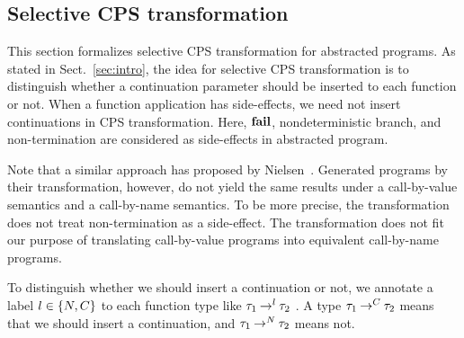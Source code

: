 \subsection{Selective CPS transformation}
\label{sec:CPS}

This section formalizes selective CPS transformation for abstracted
programs.  As stated in Sect.~\ref{sec:intro}, the idea for selective CPS
transformation is to distinguish whether a continuation parameter should
be inserted to each function or not.  When a function application has
side-effects, we need not insert continuations in CPS transformation.
Here, $\FAIL$, nondeterministic branch, and non-termination are
considered as side-effects in abstracted program.

Note that a similar approach has proposed by Nielsen~\cite{Nielsen2001}.
Generated programs by their transformation, however, do not yield the
same results under a call-by-value semantics and a call-by-name
semantics.  To be more precise, the transformation does not treat
non-termination as a side-effect.  The transformation does not fit our
purpose of translating call-by-value programs into equivalent
call-by-name programs.

To distinguish whether we should insert a continuation or not, we
annotate a label $l \in \{\NC,\IC\}$ to each function type like
$\TFunL{l}{\tau_1}{\tau_2}$ .  A type $\TFunC{\tau_1}{\tau_2}$ means
that we should insert a continuation, and $\TFunN{\tau_1}{\tau_2}$ means
not.

